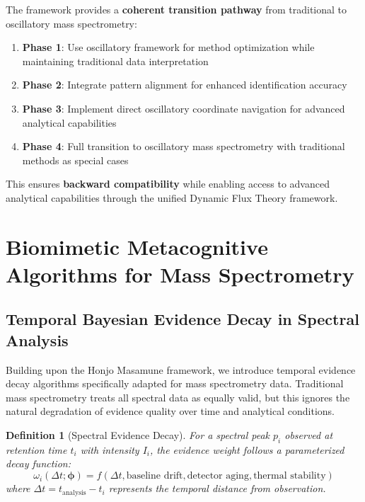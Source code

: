\documentclass[11pt,a4paper]{article}
\newtheorem{definition}[theorem]{Definition}
\theoremstyle{remark}
\begin{document}
The framework provides a \textbf{coherent transition pathway} from traditional to oscillatory mass spectrometry:

\begin{enumerate}
\item \textbf{Phase 1}: Use oscillatory framework for method optimization while maintaining traditional data interpretation
\item \textbf{Phase 2}: Integrate pattern alignment for enhanced identification accuracy  
\item \textbf{Phase 3}: Implement direct oscillatory coordinate navigation for advanced analytical capabilities
\item \textbf{Phase 4}: Full transition to oscillatory mass spectrometry with traditional methods as special cases
\end{enumerate}

This ensures \textbf{backward compatibility} while enabling access to advanced analytical capabilities through the unified Dynamic Flux Theory framework.

\section{Biomimetic Metacognitive Algorithms for Mass Spectrometry}

\subsection{Temporal Bayesian Evidence Decay in Spectral Analysis}

Building upon the Honjo Masamune framework, we introduce temporal evidence decay algorithms specifically adapted for mass spectrometry data. Traditional mass spectrometry treats all spectral data as equally valid, but this ignores the natural degradation of evidence quality over time and analytical conditions.

\begin{definition}[Spectral Evidence Decay]
For a spectral peak $p_i$ observed at retention time $t_i$ with intensity $I_i$, the evidence weight follows a parameterized decay function:
\begin{equation}
\omega_i(\Delta t; \boldsymbol{\phi}) = f(\Delta t, \text{baseline drift}, \text{detector aging}, \text{thermal stability})
\end{equation}
where $\Delta t = t_{\text{analysis}} - t_i$ represents the temporal distance from observation.
\end{definition}
\end{document}
